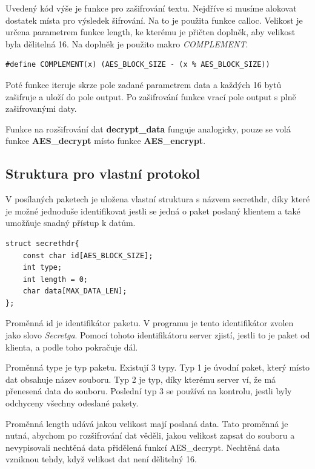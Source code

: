 \documentclass[11pt, a4paper]{article}
\begin{document}
Uvedený kód výše je funkce pro zašifrování textu. Nejdříve si musíme alokovat dostatek místa pro výsledek šifrování. Na to je použita funkce calloc. Velikost je určena parametrem funkce length, ke kterému je přičten doplněk, aby velikost byla dělitelná 16. Na doplněk je použito makro \emph{COMPLEMENT}.


\begin{verbatim}
#define COMPLEMENT(x) (AES_BLOCK_SIZE - (x % AES_BLOCK_SIZE))
\end{verbatim}


Poté funkce iteruje skrze pole zadané parametrem data a každých 16 bytů zašifruje a uloží do pole output. Po zašifrování funkce vrací pole output s plně zašifrovanými daty.

Funkce na rozšifrování dat \textbf{decrypt\_data} funguje analogicky, pouze se volá funkce \textbf{AES\_decrypt} místo funkce \textbf{AES\_encrypt}.

\subsection{Struktura pro vlastní protokol}
V posílaných paketech je uložena vlastní struktura s názvem secrethdr, díky které je možné jednoduše identifikovat jestli se jedná o paket poslaný klientem a také umožňuje snadný přístup k datům.

\newpage

\begin{verbatim}
struct secrethdr{
    const char id[AES_BLOCK_SIZE];
    int type;
    int length = 0;
    char data[MAX_DATA_LEN];
};
\end{verbatim}


Proměnná id je identifikátor paketu. V programu je tento identifikátor zvolen jako slovo \emph{Secretga}. Pomocí tohoto identifikátoru server zjistí, jestli to je paket od klienta, a podle toho pokračuje dál.

Proměnná type je typ paketu. Existují 3 typy. Typ 1 je úvodní paket, který místo dat obsahuje název souboru. Typ 2 je typ, díky kterému server ví, že má přenesená data do souboru. Poslední typ 3 se používá na kontrolu, jestli byly odchyceny všechny odeslané pakety.

Proměnná length udává jakou velikost mají poslaná data. Tato proměnná je nutná, abychom po rozšifrování dat věděli, jakou velikost zapsat do souboru a nevypisovali nechtěná data přidělená funkcí AES\_decrypt. Nechtěná data vzniknou tehdy, když velikost dat není dělitelný 16.
\end{document}
